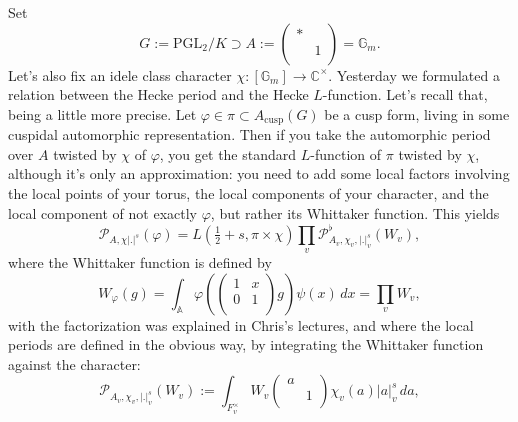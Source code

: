 \documentclass[reqno]{amsart} 
\numberwithin{theorem}{section}
\numberwithin{equation}{section}
\numberwithin{exercise}{section}
\begin{document}
Set
\begin{equation*}
  G := \mathrm{PGL}_2 / K \supset A :=
  \begin{pmatrix}
    \ast    &  \\
                                                                             & 1 \\
  \end{pmatrix}
  = \mathbb{G}_m.
\end{equation*}
Let's also fix an idele class character $\chi :[\mathbb{G}_m] \rightarrow \mathbb{C}^\times$.
Yesterday we formulated a relation between the Hecke period and the Hecke $L$-function.  Let's recall that, being a little more precise.  Let $\varphi \in \pi \subset A_{\mathrm{cusp}}(G)$ be a cusp form, living in some cuspidal automorphic representation.  Then if you take the automorphic period over $A$ twisted by $\chi$ of $\varphi$, you get the standard $L$-function of $\pi$ twisted by $\chi$, although it's only an approximation: you need to add some local factors involving the local points of your torus, the local components of your character, and the local component of not exactly $\varphi$, but rather its Whittaker function.  This yields
\begin{equation}\label{eq:cq6tx8qioa}
  \mathcal{P}_{A, \chi \lvert . \rvert^s}(\varphi) = L(\tfrac{1}{2} + s, \pi \times \chi) \prod_v \mathcal{P}_{A_v, \chi_v, \lvert . \rvert_v^s}^{\flat}(W_v),
\end{equation}
where the Whittaker function is defined by
\begin{equation*}
  W_\varphi(g) = \int_{\mathbb{A}} \varphi \left(
    \begin{pmatrix}
      1 & x \\
      0 & 1 \\
    \end{pmatrix} g \right)
  \psi(x) \, d x
  = \prod_v W_v,
\end{equation*}
with the factorization was explained in Chris's lectures, and where the local periods are defined in the obvious way, by integrating the Whittaker function against the character:
\begin{equation*}
  \mathcal{P}_{A_v, \chi_v, \lvert . \rvert_v^s}(W_v) := \int_{F_v^\times} W_v
  \begin{pmatrix}
    a    &  \\
                                                                                   & 1 \\
  \end{pmatrix}
  \chi_v(a) \lvert a \rvert_v^s \, d a,
\end{equation*}
\end{document}
